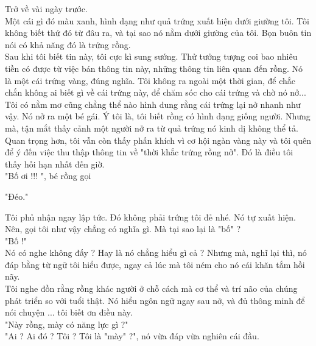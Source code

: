 	Trở về vài ngày trước. \\
	
	Một cái gì đó màu xanh, hình dạng như quả trứng xuất hiện dưới giường tôi. Tôi không biết thứ đó từ đâu ra, và tại sao nó nằm dưới giường của tôi. Bọn buôn tin nói có khả năng đó là trứng rồng. \\ 
	
	Sau khi tôi biết tin này, tôi cực kì sung sướng. Thử tưởng tượng coi bao nhiêu tiền có được từ việc bán thông tin này, những thông tin liên quan đến rồng. Nó là một cái trứng vàng, đúng nghĩa. Tôi không ra ngoài một thời gian, để chắc chắn không ai biết gì về cái trứng này, để chăm sóc cho cái trứng và chờ nó nở... \\
	
	Tôi có nằm mơ cũng chẳng thể nào hình dung rằng cái trứng lại nở nhanh như vậy. Nó nở ra một bé gái. Ý tôi là, tôi biết rồng có hình dạng giống người. Nhưng mà, tận mắt thấy cảnh một người nở ra từ quả trứng nó kinh dị không thể tả. \\
	
	Quan trọng hơn, tôi vẫn còn thấy phấn khích vì cơ hội ngàn vàng này và tôi quên để ý đến việc thu thập thông tin về "thời khắc trứng rồng nở". Đó là điều tôi thấy hối hạn nhất đến giờ. \\
	
	"Bố ơi !!! ", bé rồng gọi
	
	"Đéo." 
	
	Tôi phủ nhận ngay lập tức. Đó không phải trứng tôi đẻ nhé. Nó tự xuất hiện. Nên, gọi tôi như vậy chẳng có nghĩa gì. Mà tại sao lại là "bố" ? \\
	
	"Bố !"\\
	
	Nó có nghe không đấy ? Hay là nó chẳng hiểu gì cả ? Nhưng mà, nghĩ lại thì, nó đáp bằng từ ngữ tôi hiểu được, ngay cả lúc mà tôi ném cho nó cái khăn tắm hồi nãy. \\
	
	Tôi nghe đồn rằng rồng khác người ở chỗ cách mà cơ thể và trí não của chúng phát triển so với tuổi thật. Nó hiểu ngôn ngữ ngay sau nở, và đủ thông minh để nói chuyện ... tôi biết ơn điều này. \\
	
	"Này rồng, mày có năng lực gì ?" \\
	
	"Ai ? Ai đó ? Tôi ? Tôi là "mày"  ?", nó vừa đáp vừa nghiên cái đầu.\\
	
